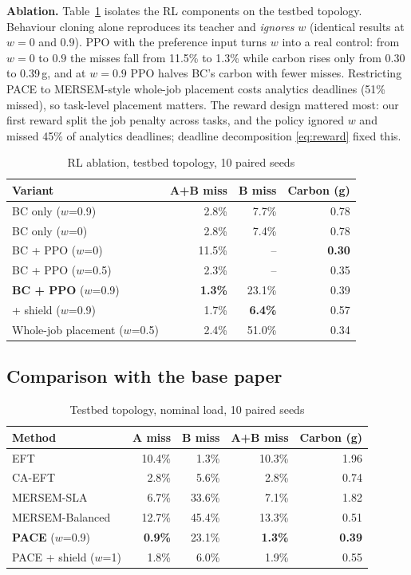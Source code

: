\documentclass[conference]{IEEEtran}
\begin{document}
\textbf{Ablation.} Table~\ref{tab:ablation} isolates the RL components on the testbed topology. Behaviour cloning alone reproduces its teacher and \emph{ignores} $w$ (identical results at $w=0$ and $0.9$). PPO with the preference input turns $w$ into a real control: from $w=0$ to $0.9$ the misses fall from 11.5\% to 1.3\% while carbon rises only from 0.30 to 0.39\,g, and at $w=0.9$ PPO halves BC's carbon with fewer misses. Restricting PACE to MERSEM-style whole-job placement costs analytics deadlines (51\% missed), so task-level placement matters. The reward design mattered most: our first reward split the job penalty across tasks, and the policy ignored $w$ and missed 45\% of analytics deadlines; deadline decomposition \eqref{eq:reward} fixed this.

\begin{table}[t]
\caption{RL ablation, testbed topology, 10 paired seeds}
\label{tab:ablation}
\centering\footnotesize
\setlength{\tabcolsep}{4pt}
\begin{tabular}{@{}lrrr@{}}
\toprule
Variant & A+B miss & B miss & Carbon (g)\\
\midrule
BC only ($w$=0.9) & 2.8\% & 7.7\% & 0.78\\
BC only ($w$=0) & 2.8\% & 7.4\% & 0.78\\
BC + PPO ($w$=0) & 11.5\% & -- & \textbf{0.30}\\
BC + PPO ($w$=0.5) & 2.3\% & -- & 0.35\\
\textbf{BC + PPO} ($w$=0.9) & \textbf{1.3\%} & 23.1\% & 0.39\\
+ shield ($w$=0.9) & 1.7\% & \textbf{6.4\%} & 0.57\\
Whole-job placement ($w$=0.5) & 2.4\% & 51.0\% & 0.34\\
\bottomrule
\end{tabular}
\end{table}

\subsection{Comparison with the base paper}
\begin{table}[t]
\caption{Testbed topology, nominal load, 10 paired seeds}
\label{tab:e1}
\centering\footnotesize
\setlength{\tabcolsep}{3.5pt}
\begin{tabular}{@{}lrrrr@{}}
\toprule
Method & A miss & B miss & A+B miss & Carbon (g)\\
\midrule
EFT & 10.4\% & 1.3\% & 10.3\% & 1.96\\
CA-EFT & 2.8\% & 5.6\% & 2.8\% & 0.74\\
MERSEM-SLA & 6.7\% & 33.6\% & 7.1\% & 1.82\\
MERSEM-Balanced & 12.7\% & 45.4\% & 13.3\% & 0.51\\
\midrule
\textbf{PACE} ($w$=0.9) & \textbf{0.9\%} & 23.1\% & \textbf{1.3\%} & \textbf{0.39}\\
PACE + shield ($w$=1) & 1.8\% & 6.0\% & 1.9\% & 0.55\\
\bottomrule
\end{tabular}
\end{table}
\end{document}
